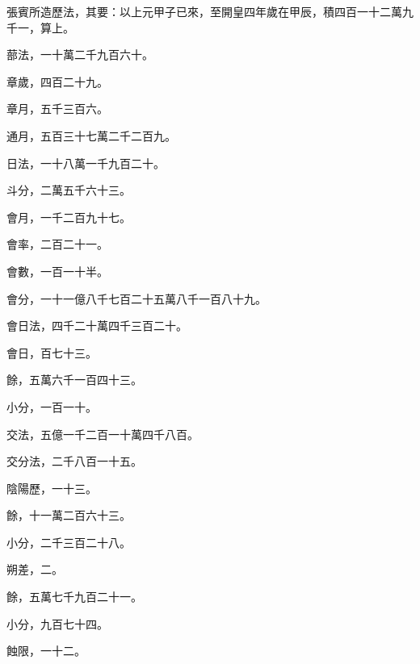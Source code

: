 \begin{pinyinscope}
 張賓所造歷法，其要：以上元甲子已來，至開皇四年歲在甲辰，積四百一十二萬九千一，算上。



 蔀法，一十萬二千九百六十。



 章歲，四百二十九。



 章月，五千三百六。



 通月，五百三十七萬二千二百九。



 日法，一十八萬一千九百二十。



 斗分，二萬五千六十三。



 會月，一千二百九十七。



 會率，二百二十一。



 會數，一百一十半。



 會分，一十一億八千七百二十五萬八千一百八十九。



 會日法，四千二十萬四千三百二十。



 會日，百七十三。



 餘，五萬六千一百四十三。



 小分，一百一十。



 交法，五億一千二百一十萬四千八百。



 交分法，二千八百一十五。



 陰陽歷，一十三。



 餘，十一萬二百六十三。



 小分，二千三百二十八。



 朔差，二。



 餘，五萬七千九百二十一。



 小分，九百七十四。



 蝕限，一十二。




\end{pinyinscope}
